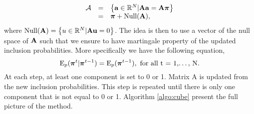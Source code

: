 \documentclass[12pt,english]{article}\usepackage[]{graphicx}\usepackage{xcolor}
\begin{document}
$$\begin{array}{cll}\mathcal{A} &=& \left\{ {\bf a} \in \mathbb{R}^N | {\bf A}{\bf a} = {\bf A}\boldsymbol{\pi} \right\}\\
&=& \boldsymbol{\pi} + \text{Null}({\bf A}),
\end{array}
$$
where $\text{Null}({\bf A}) = \left\{u \in \mathbb{R}^N | {\bf A}{\bf u} = 0 \right\}$. The idea is then to use a vector of the null space of ${\bf A}$ such that we ensure to have martingale property of the updated inclusion probabilities. More specifically we have the following equation,
$$ {\rm E}_p(\boldsymbol{\pi}^t | \boldsymbol{\pi}^{t-1}) = {\rm E}_p(\boldsymbol{\pi}^{t-1}), \text{ for all t = 1,\dots, N}.$$
At each step, at least one component is set to 0 or 1. Matrix A is updated from the new inclusion probabilities. This step is repeated until there is only one component that is not equal to 0 or 1. Algorithm \ref{algo:cube} present the full picture of the method. \cite{cha:til:06}
\end{document}
